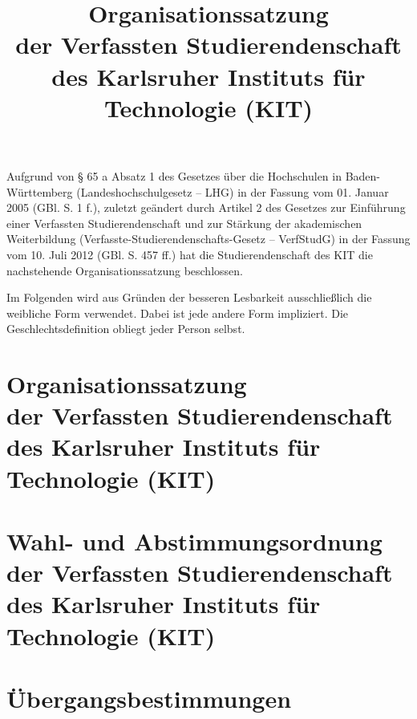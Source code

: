 \documentclass[a4paper,parskip=half,numbers=noenddot,twocolumn,titlepage,twoside]{scrartcl}
\title{Organisationssatzung \\ der Verfassten Studierendenschaft \\ des Karlsruher Instituts für Technologie (KIT)}
\author{}
\date{}
\begin{document}
\maketitle

\cleardoublepage

\tableofcontents

Aufgrund von § 65 a Absatz 1 des Gesetzes über die Hochschulen in Baden-Württemberg (Landeshochschulgesetz -- LHG) in der Fassung vom 01. Januar 2005 (GBl. S. 1 f.), zuletzt geändert durch Artikel 2 des Gesetzes zur Einführung einer Verfassten Studierendenschaft und zur Stärkung der akademischen Weiterbildung (Verfasste-Studierendenschafts-Gesetz -- VerfStudG) in der Fassung vom 10. Juli 2012 (GBl. S. 457 ff.) hat die Studierendenschaft des KIT die nachstehende Organisationssatzung beschlossen.

Im Folgenden wird aus Gründen der besseren Lesbarkeit ausschließlich die weibliche Form verwendet. Dabei ist jede andere Form impliziert. Die Geschlechtsdefinition obliegt jeder Person selbst.




\part[Organisationssatzung]{Organisationssatzung \\ der Verfassten Studierendenschaft \\ des Karlsruher Instituts für Technologie (KIT)}




\part[Wahl- und Abstimmungsordnung]{Wahl- und Abstimmungsordnung \\ der Verfassten Studierendenschaft \\ des Karlsruher Instituts für Technologie (KIT)}




\part{Übergangsbestimmungen}



\end{document}
